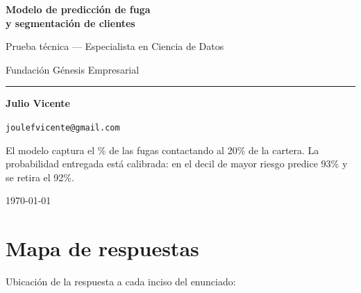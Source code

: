 \documentclass[11pt,a4paper]{article}
\begin{document}
\begin{titlepage}
\centering
\vspace*{2.2cm}

{\sffamily\Huge\bfseries\color{gprimario}
Modelo de predicción de fuga\\[0.25em]
y segmentación de clientes\par}

\vspace{0.9cm}
{\sffamily\large\color{ggris}
Prueba técnica --- Especialista en Ciencia de Datos\par}

\vspace{0.4cm}
{\sffamily\large Fundación Génesis Empresarial\par}

\vspace{2.2cm}
\rule{0.5\textwidth}{0.8pt}

\vspace{1.1cm}
{\large\textbf{Julio Vicente}\par}
\vspace{0.3em}
{\small\texttt{joulefvicente@gmail.com}\par}

\vspace{1.8cm}
\begin{minipage}{0.82\textwidth}\centering\small\color{ggris}
El modelo captura el \CapturaVeinte\% de las fugas contactando al 20\% de la
cartera. La probabilidad entregada está calibrada: en el decil de mayor riesgo
predice 93\% y se retira el 92\%.
\end{minipage}

\vfill
{\small \today\par}
\end{titlepage}

\section*{Mapa de respuestas}

\noindent Ubicación de la respuesta a cada inciso del enunciado:
\end{document}
